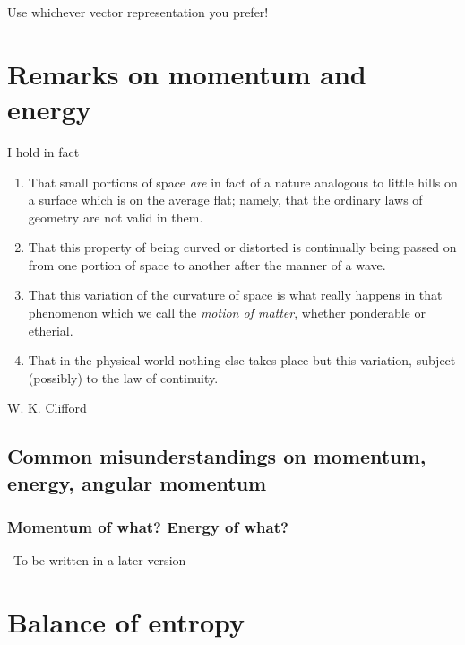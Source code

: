 \documentclass[a4paper,12pt,%
onecolumn,oneside,%
british%
]{memoir}
\newcommand{\mynotew}[1]{{\footnotesize\color{midgrey}\faIcon{tools}\ #1}}
\renewcommand*{\|}[1][]{\nonscript\:#1\vert\nonscript\:\mathopen{}}
\begin{document}
Use whichever vector representation you prefer! %



\printpagenotes*
\clearpage
\chapter{Remarks on momentum and energy}
\label{cha:energymomentum}

\epigraph{%
I hold in fact
 \begin{enumerate}[label=(\arabic*),wide,nosep,itemindent=2em]
 \item That small portions of space \emph{are} in fact of a nature analogous to little hills on a surface which is on the average flat; namely, that the ordinary laws of geometry are not valid in them.
 \item That this property of being curved or distorted is continually being passed on from one portion of space to another after the manner of a wave.
 \item That this variation of the curvature of space is what really happens in that phenomenon which we call the \emph{motion of matter}, whether ponderable or etherial.
 \item That in the physical world nothing else takes place but this variation, subject (possibly) to the law of continuity.
 \end{enumerate}
}{W. K. Clifford \cites*{clifford1876}}

\section{Common misunderstandings on momentum, energy, angular momentum}
\label{sec:pitfalls_energy_momentum}

\subsection{Momentum of what? Energy of what?}
\label{sec:momentum_of_what}




\mynotew{To be written in a later version}


\printpagenotes*
\clearpage
\chapter{Balance of entropy}
\label{cha:bal_entropy}
\end{document}
